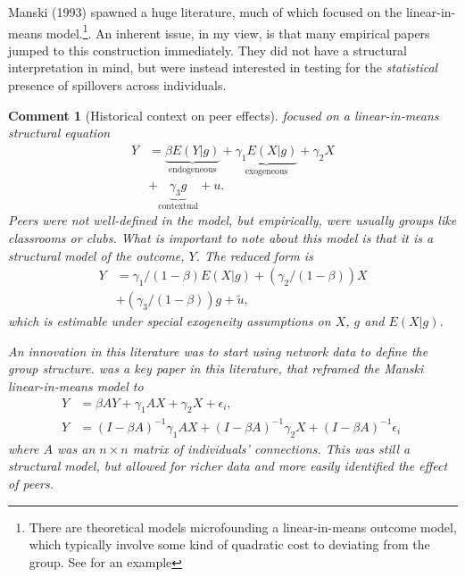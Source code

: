 \documentclass{tufte-handout}
\theoremstyle{break}
\newtheorem{cmt}{Comment}
\begin{document}
Manski (1993) spawned a huge literature, much of which  focused on the linear-in-means model.\footnote{There are theoretical models microfounding a linear-in-means outcome model, which typically involve some kind of quadratic cost to deviating from the group. See \citet{shue2013executive} for an example}. An inherent issue, in my view, is that many empirical papers
jumped to this construction immediately. They did not have a structural interpretation in mind, but were instead interested in testing for the \emph{statistical} presence of spillovers across individuals. 

\begin{boxF}
  \begin{cmt}[Historical context on peer effects]
    \citet{manski1993identification} focused on a linear-in-means structural equation
  \begin{align*}
    Y &= \underbrace{\beta E(Y|g)}_{\text{endogeneous}} + \underbrace{\gamma_{1} E(X|g)}_{\text{exogeneous}} + \gamma_{2} X\\
    &+ \underbrace{\gamma_{3} g}_{\text{contextual}} + u. 
  \end{align*}
 Peers were not well-defined in the model, but empirically, were usually groups like
classrooms or clubs. What is important to note about this model is that it is a \emph{structural} model of the outcome, $Y$.  The reduced form is
\begin{align*}
  Y &=  \gamma_{1}/(1-\beta) E(X|g) + (\gamma_{2}/(1-\beta)) X\\
    &+ (\gamma_{3}/(1-\beta)) g + \tilde{u}, 
  \end{align*}
  which is estimable under special exogeneity assumptions on $X$, $g$ and $E(X|g)$. 

  \hspace{10pt} An innovation in this literature was to start using network data to define the group structure.  \citet{bramoulle2009identification} was a key paper in this literature, that reframed the Manski linear-in-means model to
  \begin{align*}
    Y &= \beta AY  + \gamma_{1} AX + \gamma_{2}X + \epsilon_{i},\; \\
    Y  &=   (I-\beta A)^{-1}\gamma_{1} AX + (I-\beta A)^{-1}\gamma_{2}X + (I-\beta A)^{-1}\epsilon_{i} \; 
  \end{align*}
where $A$ was an $n \times n$ matrix of individuals' connections. This was still a structural model, but allowed for richer data and more easily identified the effect of peers. 
\end{cmt}
\end{boxF}
\end{document}
